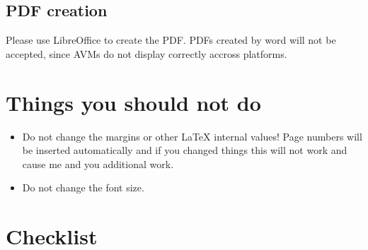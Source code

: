 \documentclass[11pt,a4paper,fleqn]{article}
\begin{document}
\subsection{PDF creation}
\label{sec-pdf-creation-word}

Please use LibreOffice to create the PDF. PDFs created by word will not be accepted, since AVMs do
not display correctly accross platforms.

\section{Things you should not do}

\begin{itemize}
\item Do not change the margins or other \LaTeX{} internal values! Page numbers will be inserted automatically and
      if you changed things this will not work and cause me and you additional work.
\item Do not change the font size.
\end{itemize}


\section{Checklist}
\end{document}
